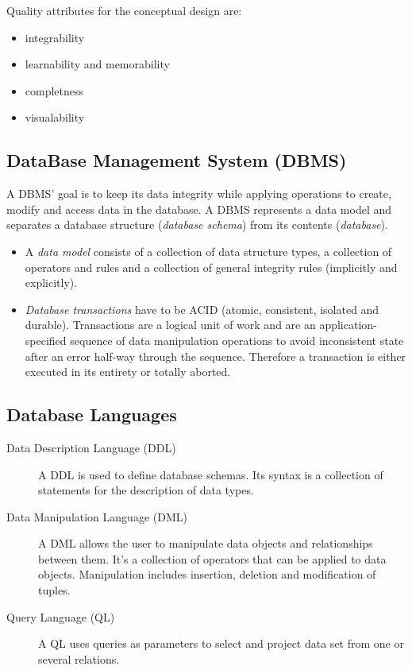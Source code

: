 \documentclass[a4paper,twocolumn]{article}
\begin{document}
Quality attributes for the conceptual design are:
%
\begin{itemize}
  \item integrability
  \item learnability and memorability
  \item completness
  \item visualability
\end{itemize}

\subsection{DataBase Management System (DBMS)}

A DBMS' goal is to keep its data integrity while applying operations to create,
modify and access data in the database. A DBMS represents a data model and
separates a database structure (\emph{database schema}) from its contents
(\emph{database}).

\begin{itemize}
  \item A \emph{data model} consists of a collection of data structure types,
        a collection of operators and rules and a collection of general
        integrity rules (implicitly and explicitly).
  \item \emph{Database transactions} have to be
        ACID (atomic, consistent, isolated and durable).
        Transactions are a logical unit of work and are an application-specified
        sequence of data manipulation operations to avoid inconsistent state
        after an error half-way through the sequence. Therefore a transaction
        is either executed in its entirety or totally aborted.
\end{itemize}

\subsection{Database Languages}

\begin{description}
  \item[Data Description Language (DDL)]
    A DDL is used to define database schemas. Its syntax is a collection of
    statements for the description of data types.
  \item[Data Manipulation Language (DML)]
    A DML allows the user to manipulate data objects and relationships
    between them. It's a collection of operators that can be applied to
    data objects. Manipulation includes insertion, deletion and modification
    of tuples.
  \item[Query Language (QL)]
    A QL uses queries as parameters to select and project data set from
    one or several relations.
\end{description}
\end{document}
